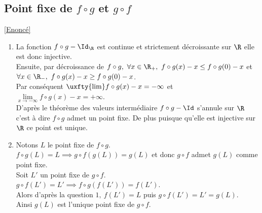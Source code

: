 \documentclass{book}
\begin{document}
	\subsection{Point fixe de $f\circ g$ et $g\circ f$ }
	\label{Point fixe de fog et gof corrigé}
	\textcolor{blue}{\hyperref[Point fixe de fog et gof]{[Enoncé]}}\\
	\begin{enumerate}[leftmargin=*]
		\item La fonction $f\circ g-\Id_\R$ est continue et strictement décroissante sur $\R$ elle est donc injective.\\
		Ensuite, par décroissance de $f\circ g,\ \forall x\in \R_+,\ f\circ g(x)-x\leq f\circ g(0)-x$ et $\forall x\in \R_-,\ f\circ g(x)-x\geq f\circ g(0)-x$.\\
		Par conséquent $\uxfty{\lim}f\circ g(x)-x=-\infty$ et $\underset{x\to -\infty}{\lim}f\circ g(x)-x=+\infty$.\\
		D'après le théorème des valeurs intermédiaire $f\circ g-\Id$ s'annule sur $\R$ c'est à dire $f\circ g$ admet un point fixe. De plus puisque qu'elle est injective sur $\R$ ce point est unique.
		\item Notons $L$ le point fixe de $f\circ g$.\\
		$f\circ g(L)=L\implies g\circ f(g(L))=g(L)$ et donc $g\circ f$ admet $g(L)$ comme point fixe.\\
		Soit $L'$ un point fixe de $g\circ f$.\\
		$g\circ f(L')=L'\implies f\circ g(f(L'))=f(L')$.\\
		Alors d'après la question $1,\ f(L')=L$ puis $g\circ f(L')=L'=g(L)$.\\
		Ainsi $g(L)$ est l'unique point fixe de $g\circ f$.
	\end{enumerate}
		
\end{document}
